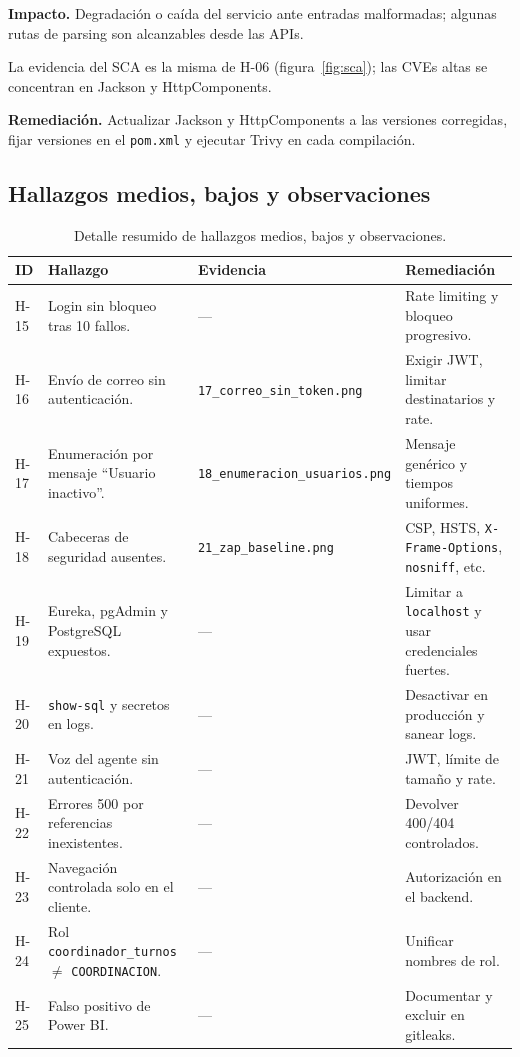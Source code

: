 \textbf{Impacto.} Degradación o caída del servicio ante entradas malformadas;
algunas rutas de parsing son alcanzables desde las APIs.

La evidencia del SCA es la misma de H-06 (figura~\ref{fig:sca}); las CVEs altas
se concentran en Jackson y HttpComponents.

\textbf{Remediación.} Actualizar Jackson y HttpComponents a las versiones
corregidas, fijar versiones en el \texttt{pom.xml} y ejecutar Trivy en cada
compilación.

\subsection{Hallazgos medios, bajos y observaciones}

\begin{table}[htbp]
\centering
\caption{Detalle resumido de hallazgos medios, bajos y observaciones.}
\label{tab:medios}
\small
\setlength{\tabcolsep}{3pt}
\begin{tabular}{@{}L{1.0cm}L{4.8cm}L{5.0cm}L{4.5cm}@{}}
\toprule
\textbf{ID} & \textbf{Hallazgo} & \textbf{Evidencia} & \textbf{Remediación}\\
\midrule
H-15 & Login sin bloqueo tras 10 fallos. & --- & Rate limiting y bloqueo progresivo.\\
H-16 & Envío de correo sin autenticación. & \texttt{17\_correo\_sin\_token.png} & Exigir JWT, limitar destinatarios y rate.\\
H-17 & Enumeración por mensaje ``Usuario inactivo''. & \texttt{18\_enumeracion\_usuarios.png} & Mensaje genérico y tiempos uniformes.\\
H-18 & Cabeceras de seguridad ausentes. & \texttt{21\_zap\_baseline.png} & CSP, HSTS, \texttt{X-Frame-Options}, \texttt{nosniff}, etc.\\
H-19 & Eureka, pgAdmin y PostgreSQL expuestos. & --- & Limitar a \texttt{localhost} y usar credenciales fuertes.\\
H-20 & \texttt{show-sql} y secretos en logs. & --- & Desactivar en producción y sanear logs.\\
H-21 & Voz del agente sin autenticación. & --- & JWT, límite de tamaño y rate.\\
H-22 & Errores 500 por referencias inexistentes. & --- & Devolver 400/404 controlados.\\
H-23 & Navegación controlada solo en el cliente. & --- & Autorización en el backend.\\
H-24 & Rol \texttt{coordinador\_turnos} \(\neq\) \texttt{COORDINACION}. & --- & Unificar nombres de rol.\\
H-25 & Falso positivo de Power BI. & --- & Documentar y excluir en gitleaks.\\
\bottomrule
\end{tabular}
\end{table}

